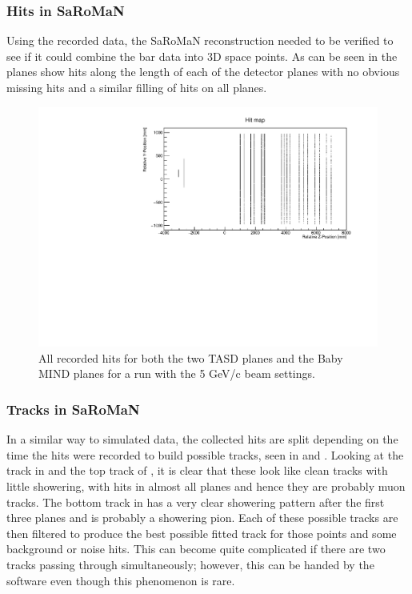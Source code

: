 \subsubsection{Hits in SaRoMaN}
Using the recorded data, the SaRoMaN reconstruction needed to be verified to see if it could combine the bar data into 3D space points. As can be seen in  the planes show hits along the length of each of the detector planes with no obvious missing hits and a similar filling of hits on all planes.

\begin{figure}[h!]
\centering
\includegraphics[width=\textwidth]{figures/HitMap5GeVYZ.pdf}
\caption{All recorded hits for both the two TASD planes and the Baby MIND planes for a run with the 5 GeV/c beam settings.}
\label{fig:hitmap}
\end{figure}


\subsubsection{Tracks in SaRoMaN}
In a similar way to simulated data, the collected hits are split depending on the time the hits were recorded to build possible tracks, seen in  and . Looking at the track in  and the top track of , it is clear that these look like clean tracks with little showering, with hits in almost all planes and hence they are probably muon tracks. The bottom track in  has a very clear showering pattern after the first three planes and is probably a showering pion. Each of these possible tracks are then filtered to produce the best possible fitted track for those points and some background or noise hits. This can become quite complicated if there are two tracks passing through simultaneously; however, this can be handed by the software even though this phenomenon is rare.

